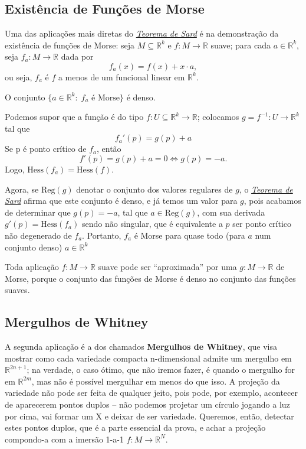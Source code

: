 \documentclass[../differential_topology.tex]{subfiles}
\begin{document}
\subsection{Existência de Funções de Morse}
Uma das aplicações mais diretas do \hyperlink{sard_theorem}{\textit{Teorema de Sard}} é na demonstração da existência de funções de Morse: seja \(M\subseteq \mathbb{R}^{k}\) e \(f:M\rightarrow \mathbb{R}\) suave; para cada \(a\in \mathbb{R}^{k}\), seja \(f_{a}:M\rightarrow \mathbb{R}\) dada por
\[
	f_{a}(x) = f(x) + x \cdot a,
\]
ou seja, \(f_{a}\) é \(f\) a menos de um funcional linear em \(\mathbb{R}^{k}\).
\begin{theorem*}
	O conjunto \(\{a\in \mathbb{R}^{k}:\; f_{a} \text{ é Morse}\}\) é denso.
\end{theorem*}
\begin{proof*}
	Podemos supor que a função é do tipo \(f:U\subseteq \mathbb{R}^{k}\rightarrow \mathbb{R}\); colocamos \(g=f^{-1}:U\rightarrow \mathbb{R}^{k}\) tal que
	\[
		f_{a}'(p) = g(p)+a
	\]
	Se p é ponto crítico de \(f_{a}\), então
	\[
		f'(p) = g(p)+a = 0 \Longleftrightarrow g(p) = -a.
	\]
	Logo, \(\mathrm{Hess}(f_{a}) = \mathrm{Hess}(f)\).

	Agora, se \(\mathrm{Reg}(g)\) denotar o conjunto dos valores regulares de \(g\), o \hyperlink{sard_theorem}{\textit{Teorema de Sard}} afirma que este conjunto é denso, e já temos um valor para \(g\), pois acabamos de determinar que \(g(p)=-a\), tal que \(a\in \mathrm{Reg}(g)\), com sua derivada \(g'(p) = \mathrm{Hess}(f_{a})\) sendo não singular, que é equivalente a \(p\) ser ponto crítico não degenerado de \(f_{a}\).
	Portanto, \(f_{a} \) é Morse para quase todo (para \(a\) num conjunto denso) \(a\in \mathbb{R}^{k}\)
\end{proof*}
\begin{tcolorbox}[
		skin=enhanced,
		title=Observação,
		fonttitle=\bfseries,
		colframe=black,
		colbacktitle=cyan!75!white,
		colback=cyan!15,
		colbacklower=black,
		coltitle=black,
		drop fuzzy shadow,
	]
	Toda aplicação \(f:M\rightarrow \mathbb{R}\) suave pode ser ``aproximada'' por uma \(g:M\rightarrow \mathbb{R}\) de Morse, porque o conjunto das funções de Morse é denso no conjunto das funções suaves.
\end{tcolorbox}

\subsection{Mergulhos de Whitney}
A segunda aplicação é a dos chamados \textbf{Mergulhos de Whitney}, que visa mostrar como cada variedade compacta n-dimensional admite um mergulho em \(\mathbb{R}^{2n+1}\); na verdade, o caso ótimo, que não iremos fazer, é quando o mergulho for em \(\mathbb{R}^{2m}\), mas não é possível mergulhar em menos do que isso.
A projeção da variedade não pode ser feita de qualquer jeito, pois pode, por exemplo, acontecer de aparecerem pontos duplos -- não podemos projetar um círculo jogando a luz por cima, vai formar um X e deixar de ser variedade.
Queremos, então, detectar estes pontos duplos, que é a parte essencial da prova, e achar a projeção compondo-a com a imersão 1-a-1 \(f:M\rightarrow \mathbb{R}^{N}\).
\end{document}
